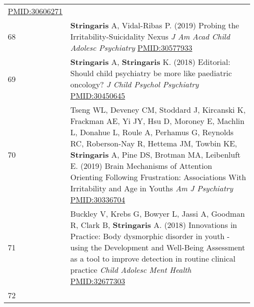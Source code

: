 \documentclass[
]{article}
\begin{document}
\begin{longtable}[]{@{}ll@{}}
\begin{minipage}[t]{0.94\columnwidth}
\url{PMID:30606271}\strut
\end{minipage}\tabularnewline
\begin{minipage}[t]{0.01\columnwidth}\raggedright
68\strut
\end{minipage} & \begin{minipage}[t]{0.94\columnwidth}\raggedright
\textbf{Stringaris} A, Vidal-Ribas P. (2019) Probing the
Irritability-Suicidality Nexus \emph{J Am Acad Child Adolesc Psychiatry}
\url{PMID:30577933}\strut
\end{minipage}\tabularnewline
\begin{minipage}[t]{0.01\columnwidth}\raggedright
69\strut
\end{minipage} & \begin{minipage}[t]{0.94\columnwidth}\raggedright
\textbf{Stringaris} A, \textbf{Stringaris} K. (2018) Editorial: Should
child psychiatry be more like paediatric oncology? \emph{J Child Psychol
Psychiatry} \url{PMID:30450645}\strut
\end{minipage}\tabularnewline
\begin{minipage}[t]{0.01\columnwidth}\raggedright
70\strut
\end{minipage} & \begin{minipage}[t]{0.94\columnwidth}\raggedright
Tseng WL, Deveney CM, Stoddard J, Kircanski K, Frackman AE, Yi JY, Hsu
D, Moroney E, Machlin L, Donahue L, Roule A, Perhamus G, Reynolds RC,
Roberson-Nay R, Hettema JM, Towbin KE, \textbf{Stringaris} A, Pine DS,
Brotman MA, Leibenluft E. (2019) Brain Mechanisms of Attention Orienting
Following Frustration: Associations With Irritability and Age in Youths
\emph{Am J Psychiatry} \url{PMID:30336704}\strut
\end{minipage}\tabularnewline
\begin{minipage}[t]{0.01\columnwidth}\raggedright
71\strut
\end{minipage} & \begin{minipage}[t]{0.94\columnwidth}\raggedright
Buckley V, Krebs G, Bowyer L, Jassi A, Goodman R, Clark B,
\textbf{Stringaris} A. (2018) Innovations in Practice: Body dysmorphic
disorder in youth - using the Development and Well-Being Assessment as a
tool to improve detection in routine clinical practice \emph{Child
Adolesc Ment Health} \url{PMID:32677303}\strut
\end{minipage}\tabularnewline
\begin{minipage}[t]{0.01\columnwidth}\raggedright
72\strut
\end{minipage} & \begin{minipage}[t]{0.94\columnwidth}\raggedright

\end{minipage}
\end{longtable}
\end{document}
